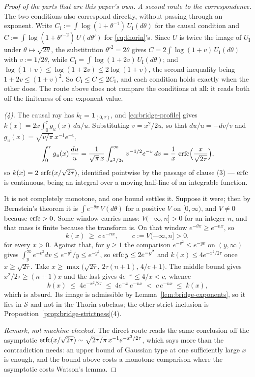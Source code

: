\begin{proof}[Proof of the parts that are this paper's own]
\emph{A second route to the correspondence.} The two conditions also correspond directly, without
passing through an exponent. Write
$C_{\mathrm I} := \int\log(1 + \theta^{-1})\,U_{\mathrm I}(d\theta)$ for the causal condition and
$C := \int\log(1 + \theta'^{-2})\,U(d\theta')$ for \ref{eq:thorin}'s. Since $U$ is twice the image
of $U_{\mathrm I}$ under $\theta \mapsto \sqrt{2\theta}$, the substitution $\theta'^2 = 2\theta$
gives $C = 2\int\log(1 + v)\,U_{\mathrm I}(d\theta)$ with $v := 1/2\theta$, while
$C_{\mathrm I} = \int\log(1 + 2v)\,U_{\mathrm I}(d\theta)$; and
$\log(1+v) \le \log(1+2v) \le 2\log(1+v)$, the second inequality being $1 + 2v \le (1+v)^2$. So
$C_{\mathrm I} \le C \le 2C_{\mathrm I}$, and each condition holds exactly when the other does.
The route above does not compare the conditions at all: it reads both off the finiteness of one
exponent value.

\emph{(4).} The causal ray has $k_{\mathrm I} = \mathbf 1_{(0,\tau)}$, and
\ref{eq:bridge-profile} gives $k(x) = 2x\int_0^\tau g_u(x)\,du/u$. Substituting $v = x^2/2u$,
so that $du/u = -dv/v$ and $g_u(x) = \sqrt{v/\pi}\,x^{-1}e^{-v}$,
\[
  \int_0^\tau g_u(x)\,\frac{du}{u}
  = \frac{1}{\sqrt\pi\,x}\int_{x^2/2\tau}^\infty v^{-1/2}e^{-v}\,dv
  = \frac{1}{x}\,\operatorname{erfc}\Bigl(\frac{x}{\sqrt{2\tau}}\Bigr),
\]
so $k(x) = 2\,\operatorname{erfc}(x/\sqrt{2\tau})$, identified pointwise by the passage of clause (3) ---
$\operatorname{erfc}$ is continuous, being an integral over a moving half-line of an integrable function.

It is not completely monotone, and one bound settles it. Suppose it were; then by Bernstein's
theorem it is $\int e^{-\theta x}\,V(d\theta)$ for a positive $V$ on $[0,\infty)$, and $V \ne 0$
because $\operatorname{erfc} > 0$. Some window carries mass: $V(-\infty, n] > 0$ for an integer $n$, and that
mass is finite because the transform is. On that window $e^{-\theta x} \ge e^{-nx}$, so
\[
  k(x) \;\ge\; c\,e^{-nx}, \qquad c := V(-\infty,n] > 0,
\]
for every $x > 0$. Against that, for $y \ge 1$ the comparison $e^{-v^2} \le e^{-yv}$ on
$(y,\infty)$ gives $\int_y^\infty e^{-v^2}dv \le e^{-y^2}/y \le e^{-y^2}$, so
$\operatorname{erfc} y \le 2e^{-y^2}$ and $k(x) \le 4e^{-x^2/2\tau}$ once $x \ge \sqrt{2\tau}$. Take
$x \ge \max\bigl(\sqrt{2\tau},\,2\tau(n+1),\,4/c + 1\bigr)$. The middle bound gives
$x^2/2\tau \ge (n+1)x$ and the last gives $4e^{-x} \le 4/x < c$, whence
\[
  k(x) \;\le\; 4e^{-x^2/2\tau} \;\le\; 4e^{-x}\,e^{-nx} \;<\; c\,e^{-nx} \;\le\; k(x),
\]
which is absurd. Its image is admissible by Lemma~\ref{lem:bridge-exponents}, so it lies in
$\mathcal{S}$ and not in the Thorin subclass; the other strict inclusion is
Proposition~\ref{prop:bridge-strictness}(4).

\emph{Remark, not machine-checked.} The direct route reads the same conclusion off the
asymptotic $\operatorname{erfc}(x/\sqrt{2\tau}) \sim \sqrt{2\tau/\pi}\,x^{-1}e^{-x^2/2\tau}$, which says more
than the contradiction needs: an upper bound of Gaussian type at one sufficiently large $x$ is
enough, and the bound above costs a monotone comparison where the asymptotic costs Watson's
lemma.
\end{proof}

